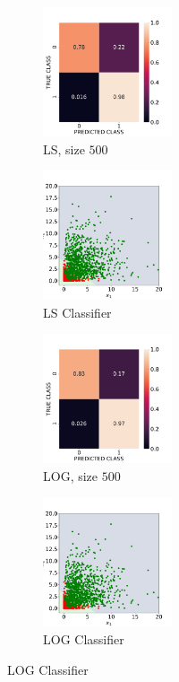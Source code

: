 \documentclass[12pt, a4 paper]{article}
\begin{document}
\begin{figure}[!htbp]
    \begin{subfigure}[!htbp]{0.2\textwidth}
       \centering
       \includegraphics[width=1.5in]{../results/ex1/acc_LS_dataset_Gamma_size_500.pdf}
       \caption{LS, size $500$}
       \label{fig:LS_P1a_500}
    \end{subfigure}
\quad
    \begin{subfigure}[!htbp]{0.2\textwidth}
       \centering
       \includegraphics[width=1.5in]{../results/ex1/samples_LS_dataset_Gamma_size_500.pdf}
       \caption{LS Classifier}
       \label{fig:LSD_P1a_500}
    \end{subfigure}
\quad
    \begin{subfigure}[!htbp]{0.2\textwidth}
       \centering
       \includegraphics[width=1.5in]{../results/ex1/acc_LOG_dataset_Gamma_size_500.pdf}
       \caption{LOG, size $500$}
       \label{fig:LOG_P1a_500}
    \end{subfigure}
\quad
    \begin{subfigure}[!htbp]{0.2\textwidth}
       \centering
       \includegraphics[width=1.5in]{../results/ex1/samples_LOG_dataset_Gamma_size_500.pdf}
       \caption{LOG Classifier}
       \label{fig:LOGD_P1a_500}
    \end{subfigure} 
    

\end{figure}
\end{document}
